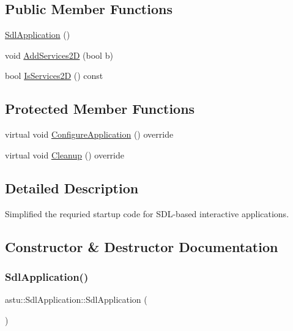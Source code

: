 \subsection*{Public Member Functions}
\begin{DoxyCompactItemize}
\item 
\hyperlink{classastu_1_1SdlApplication_a152247944516cc54cc54792f09b8bf23}{Sdl\+Application} ()
\item 
void \hyperlink{classastu_1_1SdlApplication_af07d362aa65b3e973c14e05f5079e4cd}{Add\+Services2D} (bool b)
\item 
bool \hyperlink{classastu_1_1SdlApplication_a9eff9632914987b4f7998e341d203b4b}{Is\+Services2D} () const
\end{DoxyCompactItemize}
\subsection*{Protected Member Functions}
\begin{DoxyCompactItemize}
\item 
virtual void \hyperlink{classastu_1_1SdlApplication_af309f097b9ec604101d9c0cbd66e8ba1}{Configure\+Application} () override
\item 
virtual void \hyperlink{classastu_1_1SdlApplication_adbe5cb831451f65b635d37f57bacef3f}{Cleanup} () override
\end{DoxyCompactItemize}


\subsection{Detailed Description}
Simplified the requried startup code for S\+D\+L-\/based interactive applications. 

\subsection{Constructor \& Destructor Documentation}
\mbox{\label{classastu_1_1SdlApplication_a152247944516cc54cc54792f09b8bf23}} 
\subsubsection{\texorpdfstring{Sdl\+Application()}{SdlApplication()}}
{\footnotesize\ttfamily astu\+::\+Sdl\+Application\+::\+Sdl\+Application (\begin{DoxyParamCaption}{ }\end{DoxyParamCaption})}

